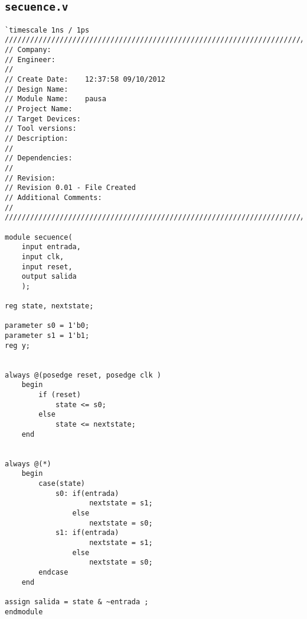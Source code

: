 \documentclass[a4paper,10pt]{article}
\begin{document}
{{\subsection{{\tt secuence.v}}
\label{appendix:secuence.v}
\begin{verbatim}
`timescale 1ns / 1ps
//////////////////////////////////////////////////////////////////////////////////
// Company: 
// Engineer: 
// 
// Create Date:    12:37:58 09/10/2012 
// Design Name: 
// Module Name:    pausa 
// Project Name: 
// Target Devices: 
// Tool versions: 
// Description: 
//
// Dependencies: 
//
// Revision: 
// Revision 0.01 - File Created
// Additional Comments: 
//
//////////////////////////////////////////////////////////////////////////////////

module secuence(
    input entrada,
    input clk,
    input reset,
    output salida
    );

reg state, nextstate;

parameter s0 = 1'b0;
parameter s1 = 1'b1;
reg y;


always @(posedge reset, posedge clk )
    begin
        if (reset)
            state <= s0;
        else
            state <= nextstate;
    end


always @(*)
    begin
        case(state)
            s0: if(entrada) 
                    nextstate = s1;
                else
                    nextstate = s0;
            s1: if(entrada)
                    nextstate = s1;
                else
                    nextstate = s0;
        endcase
    end

assign salida = state & ~entrada ;
endmodule
\end{verbatim}
}}
\end{document}
